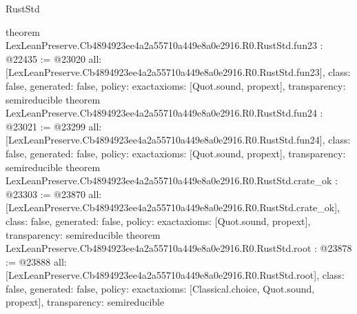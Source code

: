 \begin{lexlean}{RustStd}
\begin{coremodule}
{}
theorem LexLeanPreserve.Cb4894923ee4a2a55710a449e8a0e2916.R0.RustStd.fun23 : @22435 := @23020 {
  all: [LexLeanPreserve.Cb4894923ee4a2a55710a449e8a0e2916.R0.RustStd.fun23],
  class: false,
  generated: false,
  policy: exact{axioms: [Quot.sound, propext]},
  transparency: semireducible
}
theorem LexLeanPreserve.Cb4894923ee4a2a55710a449e8a0e2916.R0.RustStd.fun24 : @23021 := @23299 {
  all: [LexLeanPreserve.Cb4894923ee4a2a55710a449e8a0e2916.R0.RustStd.fun24],
  class: false,
  generated: false,
  policy: exact{axioms: [Quot.sound, propext]},
  transparency: semireducible
}
theorem LexLeanPreserve.Cb4894923ee4a2a55710a449e8a0e2916.R0.RustStd.crate_ok : @23303 := @23870 {
  all: [LexLeanPreserve.Cb4894923ee4a2a55710a449e8a0e2916.R0.RustStd.crate_ok],
  class: false,
  generated: false,
  policy: exact{axioms: [Quot.sound, propext]},
  transparency: semireducible
}
theorem LexLeanPreserve.Cb4894923ee4a2a55710a449e8a0e2916.R0.RustStd.root : @23878 := @23888 {
  all: [LexLeanPreserve.Cb4894923ee4a2a55710a449e8a0e2916.R0.RustStd.root],
  class: false,
  generated: false,
  policy: exact{axioms: [Classical.choice, Quot.sound, propext]},
  transparency: semireducible
}


\end{coremodule}
\end{lexlean}
